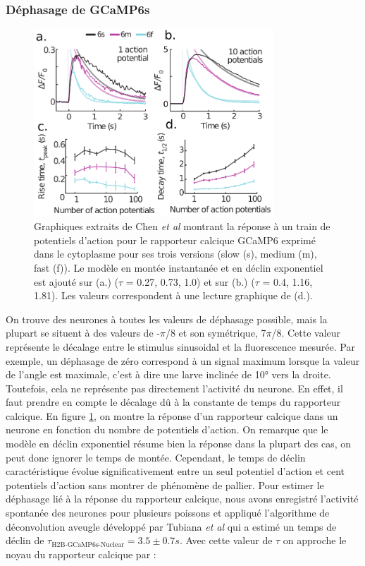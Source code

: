 \subsubsection{Déphasage de GCaMP6s}

\begin{figure}
\centering
\includegraphics[width=0.8\textwidth]{./files/chen2013_GCaMP6.svg.png}
\caption{Graphiques extraits de Chen \emph{et al} \cite{chen_ultrasensitive_2013}
montrant la réponse à un train de potentiels d'action pour le rapporteur calcique GCaMP6 exprimé dans le cytoplasme pour ses trois versions (slow (s), medium (m), fast (f)). Le modèle en montée instantanée et en déclin exponentiel est ajouté sur (a.) ($\tau$ = 0.27, 0.73, 1.0) et sur (b.) ($\tau$ = 0.4, 1.16, 1.81). Les valeurs correspondent à une lecture graphique de (d.). 
\label{FIGcalciumkernel}} 
\end{figure}

On trouve des neurones à toutes les valeurs de déphasage possible, mais la plupart se situent à des valeurs de -$\pi$/8 et son symétrique, 7$\pi$/8. Cette valeur représente le décalage entre le stimulus sinusoidal et la fluorescence mesurée. Par exemple, un déphasage de zéro correspond à un signal maximum lorsque la valeur de l'angle est maximale, c'est à dire une larve inclinée de 10° vers la droite. Toutefois, cela ne représente pas directement l'activité du neurone. En effet, il faut prendre en compte le décalage dû à la constante de temps du rapporteur calcique. En figure \ref{FIGcalciumkernel}, on montre la réponse d'un rapporteur calcique dans un neurone en fonction du nombre de potentiels d'action. On remarque que le modèle en déclin exponentiel résume bien la réponse dans la plupart des cas, on peut donc ignorer le temps de montée. Cependant, le temps de déclin caractéristique évolue significativement entre un seul potentiel d'action et cent potentiels d'action sans montrer de phénomène de pallier. Pour estimer le déphasage lié à la réponse du rapporteur calcique, nous avons enregistré l'activité spontanée des neurones pour plusieurs poissons et appliqué l'algorithme de déconvolution aveugle développé par Tubiana \emph{et al} \cite{tubiana_blind_2017} qui a estimé un temps de déclin de $\tau_\text{H2B-GCaMP6s-Nuclear} = 3.5 \pm 0.7 s$. Avec cette valeur de $\tau$ on approche le noyau du rapporteur calcique par :

